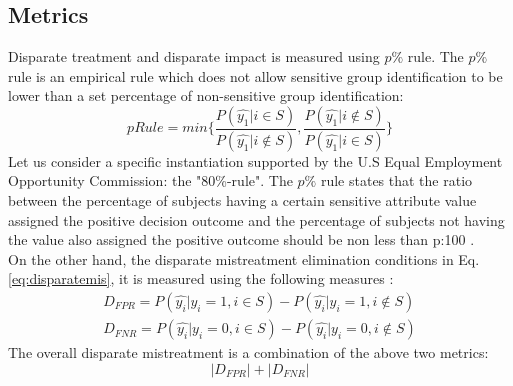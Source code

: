 \documentclass[runningheads]{llncs}
\begin{document}
\subsection{Metrics}
Disparate treatment and disparate impact is measured using $p\%$ rule. The $p\%$ \cite{biddle2006adverse} rule is an empirical rule which does not allow sensitive group identification to be lower than a set percentage of non-sensitive group identification:
\begin{equation}
pRule = min\{\frac{P(\hat{y_1}|i \in S)}{P(\hat{y_1}|i \notin S)},\frac{P(\hat{y_1}|i \notin S)}{P(\hat{y_1}|i \in S)}\}
\label{eq:prule}
\end{equation}
Let us consider a specific instantiation supported by the U.S Equal Employment Opportunity Commission: the  "80\%-rule". The $p\%$ rule states that the ratio between the percentage of subjects having a certain sensitive attribute value assigned the positive decision outcome and the percentage of subjects not having the value also assigned the positive outcome should be non less than p:100 \cite{zafar2015fairness}.\\
On the other hand, the disparate mistreatment elimination conditions in Eq. \ref{eq:disparatemis}, it is measured using the following measures \cite{krasanakis2018adaptive}:
\begin{equation}
\begin{split}
D_{FPR} = P(\hat{y_i} | y_i = 1, i \in S) - P(\hat{y_i} | y_i = 1, i \notin S) \\
D_{FNR} = P(\hat{y_i} | y_i = 0, i \in S) - P(\hat{y_i} | y_i = 0, i \notin S)
\label{eq:disparatefprfnr1}
\end{split}
\end{equation}
The overall disparate mistreatment is a combination of the above two metrics:
\begin{equation}
|D_{FPR}| + |D_{FNR}|
\label{eq:disparatefprfnr2}
\end{equation}
\end{document}
